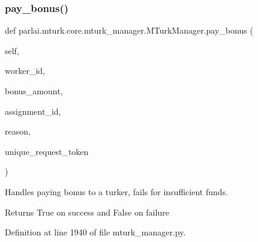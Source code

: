 \subsubsection{\texorpdfstring{pay\+\_\+bonus()}{pay\_bonus()}}
{\footnotesize\ttfamily def parlai.\+mturk.\+core.\+mturk\+\_\+manager.\+M\+Turk\+Manager.\+pay\+\_\+bonus (\begin{DoxyParamCaption}\item[{}]{self,  }\item[{}]{worker\+\_\+id,  }\item[{}]{bonus\+\_\+amount,  }\item[{}]{assignment\+\_\+id,  }\item[{}]{reason,  }\item[{}]{unique\+\_\+request\+\_\+token }\end{DoxyParamCaption})}

\begin{DoxyVerb}Handles paying bonus to a turker, fails for insufficient funds.

Returns True on success and False on failure
\end{DoxyVerb}
 

Definition at line 1940 of file mturk\+\_\+manager.\+py.


